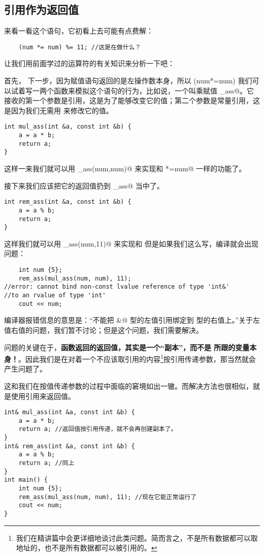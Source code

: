 \subsection*{引用作为返回值}
来看一看这个语句，它初看上去可能有点费解：
\begin{lstlisting}
    (num *= num) %= 11; //这是在做什么？
\end{lstlisting}
让我们用前面学过的运算符的有关知识来分析一下吧：\par
首先，\lstinline@%=@ 运算符把 \lstinline@(num*=num)@ 与 \lstinline@11@ 隔开。而在 \lstinline@num*=num@ 表达式中，\lstinline@*=@的作用是乘赋值，于是这个表达式的作用是把 \lstinline@num@ 变成 \lstinline@num@ 的平方。\par
下一步，因为赋值语句返回的是左操作数本身，所以 \lstinline@(num*=num)%=11@ 的作用相当于 \lstinline@num%=11@。\par
我们可以试着写一两个函数来模拟这个语句的行为，比如说，一个叫乘赋值 \lstinline@mul_ass@。它接收的第一个参数是引用，这是为了能够改变它的值；第二个参数是常量引用，这是因为我们无需用 \lstinline@b@ 来修改它的值。
\begin{lstlisting}
int mul_ass(int &a, const int &b) {
    a = a * b;
    return a;
}
\end{lstlisting}
这样一来我们就可以用 \lstinline@mul_ass(num,num)@ 来实现和 \lstinline@num*=num@ 一样的功能了。\par
接下来我们应该把它的返回值扔到 \lstinline@rem_ass@ 当中了。
\begin{lstlisting}
int rem_ass(int &a, const int &b) {
    a = a % b;
    return a;
}
\end{lstlisting}
这样我们就可以用 \lstinline@rem_ass(num,11)@ 来实现和 \lstinline@num%=11@ 一样的功能了。\par
但是如果我们这么写，编译就会出现问题：
\begin{lstlisting}
    int num {5};
    rem_ass(mul_ass(num, num), 11);
//error: cannot bind non-const lvalue reference of type 'int&'
//to an rvalue of type 'int'
    cout << num;
\end{lstlisting}
编译器报错信息的意思是：``不能把 \lstinline@int&@ 型的左值引用绑定到 \lstinline@int@ 型的右值上。''关于左值右值的问题，我们暂不讨论；但是这个问题，我们需要解决。\par
问题的关键在于，\textbf{函数返回的返回值，其实是一个``副本''，而不是 \lstinline@return@ 所跟的变量本身！}。因此我们是在对着一个不应该取引用的内容\footnote{我们在精讲篇中会更详细地谈讨此类问题。简而言之，不是所有数据都可以取地址的，也不是所有数据都可以被引用的。}按引用传递参数，那当然就会产生问题了。\par
这和我们在按值传递参数的过程中面临的窘境如出一辙。而解决方法也很相似，就是使用引用来返回值。\par
\begin{lstlisting}
int& mul_ass(int &a, const int &b) {
    a = a * b;
    return a; //返回值按引用传递，就不会再创建副本了。
}
int& rem_ass(int &a, const int &b) {
    a = a % b;
    return a; //同上
}
int main() {
    int num {5};
    rem_ass(mul_ass(num, num), 11); //现在它能正常运行了
    cout << num;
}
\end{lstlisting}
